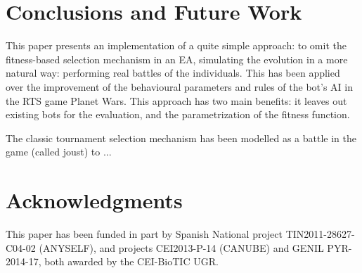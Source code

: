\documentclass[conference]{IEEEtran}
\begin{document}
%
\section{Conclusions and Future Work}
\label{sec:conclusions}

This paper presents an implementation of a quite simple approach: to omit the fitness-based selection mechanism in an EA, simulating the evolution in a more natural way: performing real battles of the individuals. This has been applied over the improvement of the behavioural parameters and rules of the bot's AI in the RTS game Planet Wars. This approach has two main benefits: it leaves out existing bots for the evaluation, and the parametrization of the fitness function.

The classic tournament selection mechanism has been modelled as a battle in the game (called joust) to ...





\section{Acknowledgments}
This paper has been funded in part by Spanish National project TIN2011-28627-C04-02 (ANYSELF), and projects CEI2013-P-14 (CANUBE) and GENIL PYR-2014-17, both awarded by the CEI-BioTIC UGR.



\end{document}
